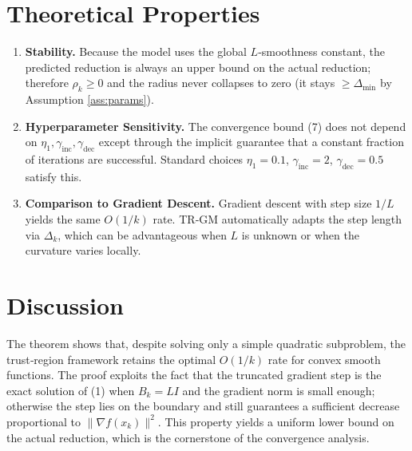 \documentclass{article}
\begin{document}
\section*{Theoretical Properties}
\begin{enumerate}[label=\arabic*.]
\item \textbf{Stability.} Because the model uses the global $L$‑smoothness constant, the predicted reduction is always an upper bound on the actual reduction; therefore $\rho_k\ge0$ and the radius never collapses to zero (it stays $\ge\Delta_{\min}$ by Assumption \ref{ass:params}).
\item \textbf{Hyperparameter Sensitivity.} The convergence bound (7) does not depend on $\eta_1,\gamma_{\text{inc}},\gamma_{\text{dec}}$ except through the implicit guarantee that a constant fraction of iterations are successful. Standard choices $\eta_1=0.1$, $\gamma_{\text{inc}}=2$, $\gamma_{\text{dec}}=0.5$ satisfy this.
\item \textbf{Comparison to Gradient Descent.} Gradient descent with step size $1/L$ yields the same $O(1/k)$ rate.  TR‑GM automatically adapts the step length via $\Delta_k$, which can be advantageous when $L$ is unknown or when the curvature varies locally.
\end{enumerate}

\section*{Discussion}
The theorem shows that, despite solving only a simple quadratic subproblem, the trust‑region framework retains the optimal $O(1/k)$ rate for convex smooth functions.  The proof exploits the fact that the truncated gradient step is the exact solution of (1) when $B_k=LI$ and the gradient norm is small enough; otherwise the step lies on the boundary and still guarantees a sufficient decrease proportional to $\|\nabla f(x_k)\|^2$.  This property yields a uniform lower bound on the actual reduction, which is the cornerstone of the convergence analysis.
\end{document}
